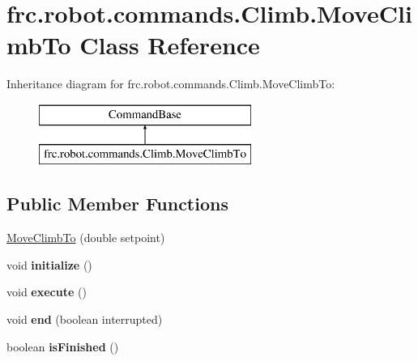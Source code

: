 \hypertarget{classfrc_1_1robot_1_1commands_1_1_climb_1_1_move_climb_to}{}\section{frc.\+robot.\+commands.\+Climb.\+Move\+Climb\+To Class Reference}
\label{classfrc_1_1robot_1_1commands_1_1_climb_1_1_move_climb_to}
Inheritance diagram for frc.\+robot.\+commands.\+Climb.\+Move\+Climb\+To\+:\begin{figure}[H]
\begin{center}
\leavevmode
\includegraphics[height=2.000000cm]{classfrc_1_1robot_1_1commands_1_1_climb_1_1_move_climb_to}
\end{center}
\end{figure}
\subsection*{Public Member Functions}
\begin{DoxyCompactItemize}
\item 
\mbox{\hyperlink{classfrc_1_1robot_1_1commands_1_1_climb_1_1_move_climb_to_a744775149caf447dd8df08b64ed7b2b3}{Move\+Climb\+To}} (double setpoint)
\item 
\mbox{\label{classfrc_1_1robot_1_1commands_1_1_climb_1_1_move_climb_to_ac4606c266391f014ce043540aeb5db36}} 
void {\bfseries initialize} ()
\item 
\mbox{\label{classfrc_1_1robot_1_1commands_1_1_climb_1_1_move_climb_to_abc788cab5e122ae18737d01bc1cd4f25}} 
void {\bfseries execute} ()
\item 
\mbox{\label{classfrc_1_1robot_1_1commands_1_1_climb_1_1_move_climb_to_a52f859ed62000d85b1afc66e0ed06b92}} 
void {\bfseries end} (boolean interrupted)
\item 
\mbox{\label{classfrc_1_1robot_1_1commands_1_1_climb_1_1_move_climb_to_a4d57a4865292804d0c51488f8b225bdd}} 
boolean {\bfseries is\+Finished} ()
\end{DoxyCompactItemize}
